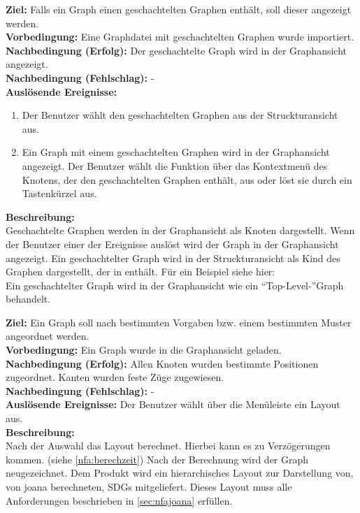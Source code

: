 \label{fa:hierarchgraph}
\textbf{Ziel:} Falls ein Graph einen geschachtelten Graphen enthält, soll dieser angezeigt werden.\\ %
\textbf{Vorbedingung:} Eine Graphdatei mit geschachtelten Graphen wurde importiert.\\
\textbf{Nachbedingung (Erfolg):} Der geschachtelte Graph wird in der Graphansicht angezeigt.\\
\textbf{Nachbedingung (Fehlschlag):} -\\
\textbf{Auslösende Ereignisse:}
\begin{enumerate}[nolistsep, label=(\alph*)]
  \item Der Benutzer wählt den geschachtelten Graphen aus der Struckturansicht aus.
  \item Ein Graph mit einem geschachtelten Graphen wird in der Graphansicht angezeigt.
    Der Benutzer wählt die Funktion über das Kontextmenü des Knotens, der den geschachtelten Graphen enthält, aus oder löst sie durch ein Tastenkürzel aus.
\end{enumerate}
\textbf{Beschreibung:}\\
Geschachtelte Graphen werden in der Graphansicht als Knoten dargestellt.
Wenn der Benutzer einer der Ereignisse auslöst wird der Graph in der Graphansicht angezeigt.
Ein geschachtelter Graph wird in der Struckturansicht als Kind des Graphen dargestellt, der in enthält. Für ein Beispiel siehe hier:\\ %
Ein geschachtelter Graph wird in der Graphansicht wie ein ``Top-Level-''Graph behandelt.


\label{fa:layout}
\textbf{Ziel:} Ein Graph soll nach bestimmten Vorgaben bzw. einem bestimmten Muster angeordnet werden.\\
\textbf{Vorbedingung:} Ein Graph wurde in die Graphansicht geladen.\\
\textbf{Nachbedingung (Erfolg):} Allen Knoten wurden bestimmte Positionen zugeordnet. Kanten wurden feste Züge zugewiesen.\\
\textbf{Nachbedingung (Fehlschlag):} -\\
\textbf{Auslösende Ereignisse:}
Der Benutzer wählt über die Menüleiste ein Layout aus.\\
\textbf{Beschreibung:}\\
Nach der Auswahl das Layout berechnet. Hierbei kann es zu Verzögerungen kommen. (siehe \ref{nfa:berechzeit})%
Nach der Berechnung wird der Graph neugezeichnet.
Dem Produkt wird ein hierarchisches Layout zur Darstellung von, von \gls{joana} berechneten, SDGs mitgeliefert.
Dieses Layout muss alle Anforderungen beschrieben in \ref{sec:nfajoana} erfüllen.


